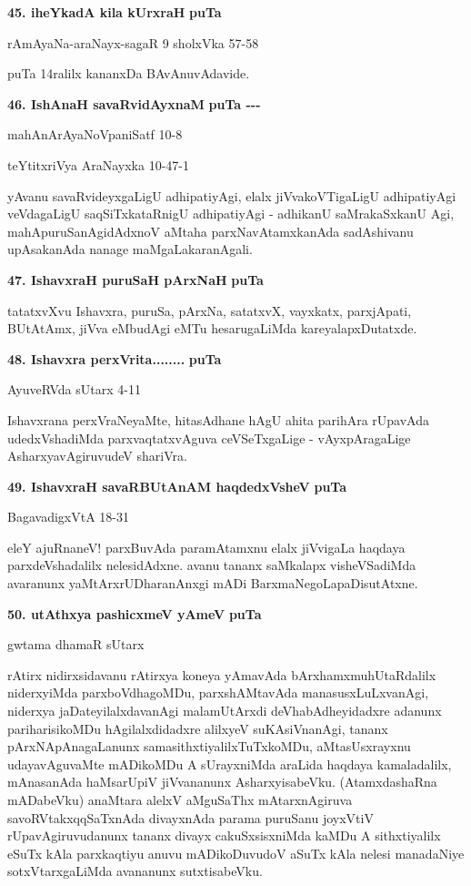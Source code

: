 \medskip
\noindent
\textbf{45. iheYkadA kila kUrxraH} \hfill{\bf puTa \pageref{13}}

\hfill{rAmAyaNa-araNayx-sagaR 9 sholxVka 57-58}

\smallskip
puTa 14ralilx kananxDa BAvAnuvAdavide.

\eject

\noindent
\textbf{46. IshAnaH savaRvidAyxnaM} \hfill{\bf puTa \pageref{20}-\pageref-\pageref{80}-\pageref{102}}

\hfill{mahAnArAyaNoVpaniSatf 10-8}

\hfill{teYtitxriVya AraNayxka 10-47-1}

\smallskip
yAvanu savaRvideyxgaLigU adhipatiyAgi, elalx jiVvakoVTigaLigU adhi\-pati\-yAgi veVdaga\-LigU saqSiTxkataRnigU adhipatiyAgi - adhikanU saMrakaSxkanU Agi, mahApuruSanAgidAdxnoV aMtaha parxNavA\-tamxkanAda sadAshivanu upAsakanAda nanage maMgaLakaranAgali.

\medskip
\noindent
\textbf{47. IshavxraH puruSaH pArxNaH} \hfill{\bf puTa \pageref{100}}

\smallskip
tatatxvXvu Ishavxra, puruSa, pArxNa, satatxvX, vayxkatx, parxjApati, BUtAtAmx, jiVva eMbudAgi eMTu hesaru\-gaLiMda kareyalapxDutatxde.

\medskip
\noindent
\textbf{48. Ishavxra perxVrita........} \hfill{\bf puTa \pageref{80}}

\hfill{AyuveRVda sUtarx 4-11}

\smallskip
Ishavxrana perxVraNeyaMte, hitasAdhane hAgU ahita parihAra rUpavAda udedxVshadiMda parxvaqtatx\-vAguva ceVSeTxgaLige - vAyxpAragaLige AsharxyavAgiruvudeV shariVra.

\medskip
\noindent
\textbf{49. IshavxraH savaRBUtAnAM haqdedxVsheV} \hfill{\bf puTa \pageref{325}}

\hfill{BagavadigxVtA 18-31}

\smallskip
eleY ajuRnaneV! parxBuvAda paramAtamxnu elalx jiVvigaLa haqdaya parxdeVshadalilx nelesidAdxne. avanu tananx saMkalapx visheVSadiMda avaranunx yaMtArxrUDharanAnxgi mADi BarxmaNegoLapaDisutAtxne.

\noindent
\textbf{50. utAthxya pashicxmeV yAmeV} \hfill{\bf puTa \pageref{149}}

\hfill{gwtama dhamaR sUtarx}

\smallskip
rAtirx nidirxsidavanu rAtirxya koneya yAmavAda bArxhamxmuhUtaRdalilx niderx\-yiMda parxboVdha\-goMDu, parxshAMtavAda manasusxLuLxvanAgi, niderxya jaDateyilalx\-davanAgi malamUtArxdi deVhabAdheyi\-dadxre adanunx pariharisikoMDu hAgilalx\break\-didadxre alilxyeV suKAsiVnanAgi, tananx pArxNApAnagaLanunx sama\-sithxtiyalilxTuTx\break\-koMDu, aMtasUsxrayxnu udayavAguvaMte mADikoMDu A sUrayxniMda ara\-Lida haqdaya kamala\-dalilx, mAnasanAda haMsarUpiV jiVvananunx AsharxyisabeVku. (AtamxdashaRna mADabeVku) anaMtara alelxV aMguSaThx mAtarxnAgiruva savoRVtakxqqSaTxnAda divayxnAda parama puruSanu joyxVtiV rUpavAgiru\-vudanunx tananx divayx cakuSxsisxniMda kaMDu A sithxtiyalilx eSuTx kAla parxkaqtiyu anuvu mADi\-koDu\-vudoV aSuTx kAla nelesi manadaNiye sotxVtarxgaLiMda avananunx sutxtisabeVku.

